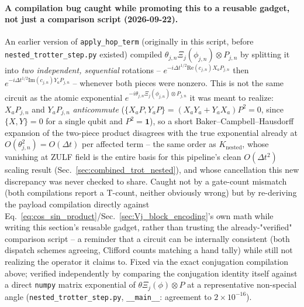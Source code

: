 \documentclass[11pt]{article}
\newcommand{\Dt}{\Delta t}
\begin{document}
\paragraph{A compilation bug caught while promoting this to a reusable gadget, not just a comparison script (2026-09-22).} An earlier version of \texttt{apply\_hop\_term} (originally in this script, before \texttt{nested\_trotter\_step.py} existed) compiled $\theta_{j,n}\Xi_j(\phi_{j,n})\otimes P_{j,n}$ by splitting it into \emph{two independent, sequential} rotations -- $e^{-i\Dt^{1/2}\text{Re}(c_{j,n})X_aP_{j,n}}$ then $e^{-i\Dt^{1/2}\text{Im}(c_{j,n})Y_aP_{j,n}}$ -- whenever both pieces were nonzero. This is not the same circuit as the atomic exponential $e^{-i\theta_{j,n}\Xi_j(\phi_{j,n})\otimes P_{j,n}}$ it was meant to realize: $X_aP_{j,n}$ and $Y_aP_{j,n}$ \emph{anticommute} ($\{X_aP,Y_aP\}=(X_aY_a+Y_aX_a)P^2=0$, since $\{X,Y\}=0$ for a single qubit and $P^2=\mathbf1$), so a short Baker--Campbell--Hausdorff expansion of the two-piece product disagrees with the true exponential already at $O(\theta_{j,n}^2)=O(\Dt)$ per affected term -- the same order as $K_{\text{nested}}$, whose vanishing at ZULF field is the entire basis for this pipeline's clean $O(\Dt^2)$ scaling result (Sec.~\ref{sec:combined_trot_nested}), and whose cancellation this new discrepancy was never checked to share. Caught not by a gate-count mismatch (both compilations report a T-count, neither obviously wrong) but by re-deriving the payload compilation directly against Eq.~\eqref{eq:cos_sin_product}/Sec.~\ref{sec:Vj_block_encoding}'s own math while writing this section's reusable gadget, rather than trusting the already-"verified" comparison script -- a reminder that a circuit can be internally consistent (both dispatch schemes agreeing, Clifford counts matching a hand tally) while still not realizing the operator it claims to. Fixed via the exact conjugation compilation above; verified independently by comparing the conjugation identity itself against a direct \texttt{numpy} matrix exponential of $\theta\Xi_j(\phi)\otimes P$ at a representative non-special angle (\texttt{nested\_trotter\_step.py}, \texttt{\_\_main\_\_}: agreement to $2\times10^{-16}$).
\end{document}
